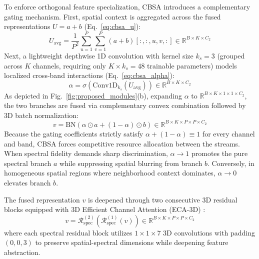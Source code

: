 \documentclass[manuscript,screen,review]{acmart}
\begin{document}
To enforce orthogonal feature specialization, CBSA introduces a complementary gating mechanism. First, spatial context is aggregated across the fused representations $U = a + b$ (Eq.~\ref{eq:cbsa_u}):
\begin{equation}
\label{eq:cbsa_u}
U_{\text{avg}} = \frac{1}{P^2} \sum_{u=1}^P \sum_{v=1}^P (a + b)[:, :, u, v, :] \in \mathbb{R}^{B \times K \times C_2}
\end{equation}
Next, a lightweight depthwise 1D convolution with kernel size $k_s = 3$ (grouped across $K$ channels, requiring only $K \times k_s = 48$ trainable parameters) models localized cross-band interactions (Eq.~\ref{eq:cbsa_alpha}):
\begin{equation}
\label{eq:cbsa_alpha}
\alpha = \sigma\left(\text{Conv1D}_{k_s}(U_{\text{avg}})\right) \in \mathbb{R}^{B \times K \times C_2}
\end{equation}
As depicted in Fig.~\ref{fig:proposed_modules}(b), expanding $\alpha$ to $\mathbb{R}^{B \times K \times 1 \times 1 \times C_2}$, the two branches are fused via complementary convex combination followed by 3D batch normalization:
\begin{equation}
\label{eq:cbsa_fuse}
v = \text{BN}\left(\alpha \odot a + (1 - \alpha) \odot b\right) \in \mathbb{R}^{B \times K \times P \times P \times C_2}
\end{equation}
Because the gating coefficients strictly satisfy $\alpha + (1 - \alpha) \equiv 1$ for every channel and band, CBSA forces competitive resource allocation between the streams. When spectral fidelity demands sharp discrimination, $\alpha \to 1$ promotes the pure spectral branch $a$ while suppressing spatial blurring from branch $b$. Conversely, in homogeneous spatial regions where neighborhood context dominates, $\alpha \to 0$ elevates branch $b$.

The fused representation $v$ is deepened through two consecutive 3D residual blocks equipped with 3D Efficient Channel Attention (ECA-3D) \cite{wang2020eca}:
\begin{equation}
\label{eq:spec_res}
v = \mathcal{R}_{\text{spec}}^{(2)}\left(\mathcal{R}_{\text{spec}}^{(1)}(v)\right) \in \mathbb{R}^{B \times K \times P \times P \times C_2}
\end{equation}
where each spectral residual block utilizes $1 \times 1 \times 7$ 3D convolutions with padding $(0, 0, 3)$ to preserve spatial-spectral dimensions while deepening feature abstraction.
\end{document}

